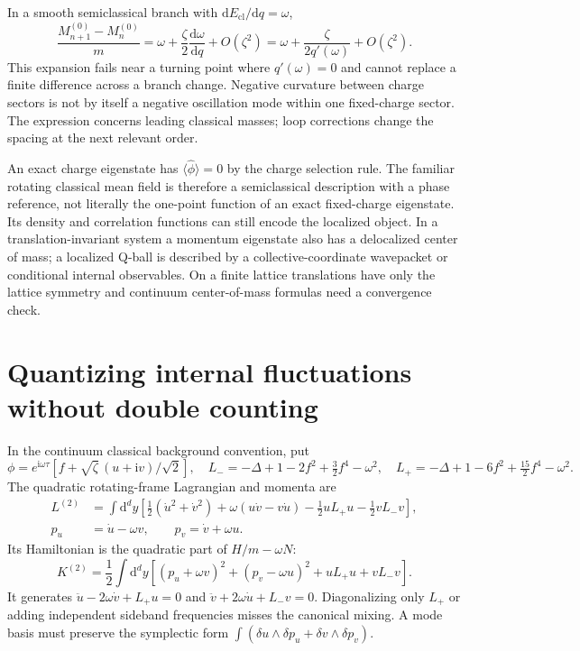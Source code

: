 \documentclass[11pt,a4paper]{article}
\newcommand{\dd}{\mathrm d}
\newcommand{\ii}{\mathrm i}
\begin{document}
In a smooth semiclassical branch with $\dd E_{\mathrm{cl}}/\dd q=\omega$,
\begin{equation}\label{eq:spacing}
 \frac{M_{n+1}^{(0)}-M_n^{(0)}}m
 =\omega+\frac\zeta2\frac{\dd\omega}{\dd q}+O(\zeta^2)
 =\omega+\frac\zeta{2q'(\omega)}+O(\zeta^2).
\end{equation}
This expansion fails near a turning point where $q'(\omega)=0$ and cannot
replace a finite difference across a branch change. Negative curvature
between charge sectors is not by itself a negative oscillation mode within
one fixed-charge sector. The expression concerns leading classical masses;
loop corrections change the spacing at the next relevant order.

An exact charge eigenstate has $\langle\hat\phi\rangle=0$ by the charge
selection rule. The familiar rotating classical mean field is therefore a
semiclassical description with a phase reference, not literally the one-point
function of an exact fixed-charge eigenstate. Its density and correlation
functions can still encode the localized object. In a translation-invariant
system a momentum eigenstate also has a delocalized center of mass; a localized
Q-ball is described by a collective-coordinate wavepacket or conditional
internal observables. On a finite lattice translations have only the lattice
symmetry and continuum center-of-mass formulas need a convergence check.

\section{Quantizing internal fluctuations without double counting}
In the continuum classical background convention, put
\begin{equation}
 \phi=e^{\ii\omega\tau}\left[f+\sqrt\zeta\,(u+\ii v)/\sqrt2\right],
 \quad L_-=-\Delta+1-2f^2+\tfrac32f^4-\omega^2,
 \quad L_+=-\Delta+1-6f^2+\tfrac{15}{2}f^4-\omega^2.
\end{equation}
The quadratic rotating-frame Lagrangian and momenta are
\begin{align}
 L^{(2)}&=\int\dd^dy\left[\tfrac12(\dot u^2+\dot v^2)
 +\omega(u\dot v-v\dot u)-\tfrac12uL_+u-\tfrac12vL_-v\right],\\
 p_u&=\dot u-\omega v,\qquad p_v=\dot v+\omega u.
\end{align}
Its Hamiltonian is the quadratic part of $H/m-\omega N$:
\begin{equation}\label{eq:k2}
 K^{(2)}=\frac12\int\dd^dy\left[(p_u+\omega v)^2+(p_v-\omega u)^2
 +uL_+u+vL_-v\right].
\end{equation}
It generates $\ddot u-2\omega\dot v+L_+u=0$ and
$\ddot v+2\omega\dot u+L_-v=0$. Diagonalizing only $L_+$ or adding
independent sideband frequencies misses the canonical mixing.
A mode basis must preserve the symplectic form
$\int(\delta u\wedge\delta p_u+\delta v\wedge\delta p_v)$.
\end{document}
